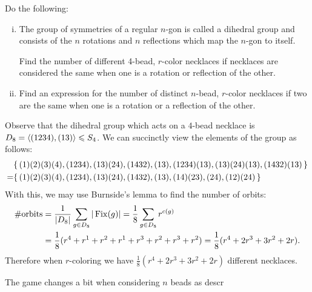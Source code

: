 \documentclass[12pt]{memoir}
\begin{document}
\begin{Ej}[6.8 Sagan]
    Do the following:
    \begin{enumerate}[i)]
        \itemsep=-0.4em
        \item  The group of symmetries of a regular $n$-gon is called a dihedral group and
        consists of the $n$ rotations and $n$ reflections which map the $n$-gon to itself.\par 
        Find the number of different 4-bead, $r$-color necklaces if necklaces are considered the same when one is a rotation or reflection of the other.
        \item Find an expression for the number of distinct $n$-bead, $r$-color necklaces if two
        are the same when one is a rotation or a reflection of the other.        
    \end{enumerate}
\end{Ej}

\begin{ptcbr}
 Observe that the dihedral group which acts on a $4$-bead necklace is $D_8=\left\langle (1234),(13)\right\rangle\leqslant S_4$. We can succinctly view the elements of the group as follows:
        \begin{align*}
            &\{\,(1)(2)(3)(4),(1234),(13)(24),(1432),(13),(1234)(13),(13)(24)(13),(1432)(13)\,\}\\
            =&\{\,(1)(2)(3)(4),(1234),(13)(24),(1432),(13),(14)(23),(24),(12)(24)\,\}
        \end{align*}
        With this, we may use Burnside's lemma to find the number of orbits:
        \begin{align*}
        \#\text{orbits}&=\frac{1}{|D_8|}\sum_{g\in D_{8}}|\operatorname{Fix}(g)|=\frac{1}{8}\sum_{g\in D_{8}}r^{c(g)}\\
        &=\frac{1}{8}(r^4+r^1+r^2+r^1+r^3+r^2+r^3+r^2)
        =\frac{1}{8}(r^4+2r^3+3r^2+2r).
        \end{align*}
Therefore when $r$-coloring we have $\frac{1}{8}(r^4+2r^3+3r^2+2r)$ different necklaces.\par 
The game changes a bit when considering $n$ beads as descr
\end{ptcbr}
\end{document}
